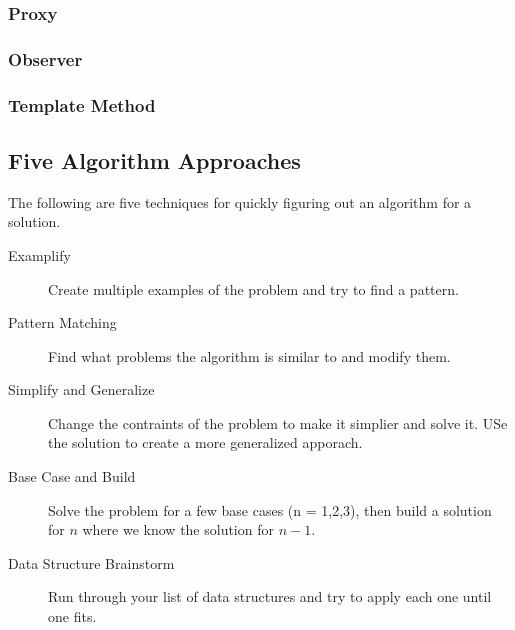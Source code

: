 \documentclass{article}
\begin{document}
		\subsubsection{Proxy}
		\subsubsection{Observer}
		\subsubsection{Template Method}


	\subsection{Five Algorithm Approaches}
		The following are five techniques for quickly figuring out an algorithm for a solution.

		\begin{description}
			\item[Examplify] Create multiple examples of the problem and try to find a pattern. \par
			\item[Pattern Matching] Find what problems the algorithm is similar to and modify them. \par

			\item[Simplify and Generalize] Change the contraints of the problem to make it simplier and solve it. USe the solution to create a more generalized apporach. \par

			\item[Base Case and Build] Solve the problem for a few base cases (n = 1,2,3), then build a solution for $n$ where we know the solution for $n - 1$.
			\item[Data Structure Brainstorm] Run through your list of data structures and try to apply each one until one fits.
		\end{description}
\end{document}
